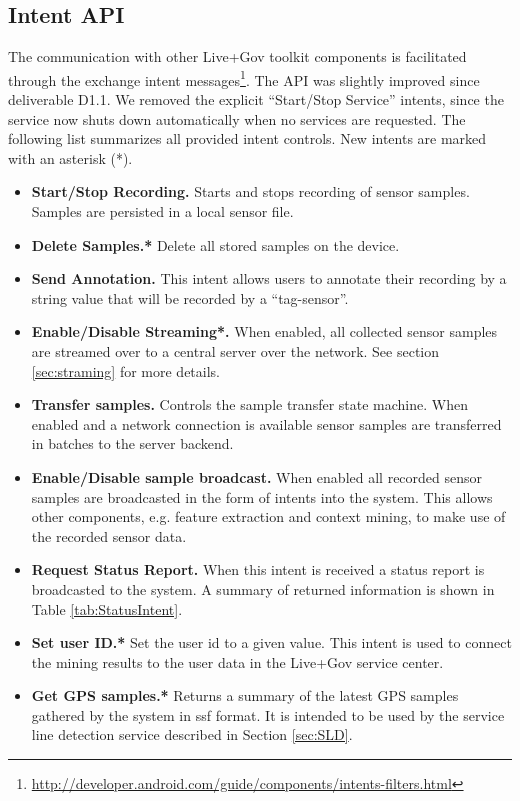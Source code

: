 \subsection{Intent API}
\label{subsubsec:IntentAPIdescription}

The communication with other Live+Gov toolkit components is
facilitated through the exchange intent
messages\footnote{\url{http://developer.android.com/guide/components/intents-filters.html}}.
The API was slightly improved since deliverable D1.1. We removed the
explicit ``Start/Stop Service'' intents, since the service now shuts
down automatically when no services are requested. The following list
summarizes all provided intent controls. New intents are marked with
an asterisk (*).

\begin{itemize}
\item {\bfseries Start/Stop Recording.} Starts and stops recording of
  sensor samples. Samples are persisted in a local sensor file.
\item {\bfseries Delete Samples.*} Delete all stored samples on the
  device.
\item {\bf Send Annotation.} This intent allows users to annotate
  their recording by a string value that will be recorded by a
  ``tag-sensor''.
\item {\bfseries Enable/Disable Streaming*.} When enabled, all
  collected sensor samples are streamed over to a central server over
  the network. See section \ref{sec:straming} for more details.
\item {\bfseries Transfer samples.}  Controls the sample transfer
  state machine. When enabled and a network connection is available
  sensor samples are transferred in batches to the server backend.
\item {\bfseries Enable/Disable sample broadcast.} When enabled all
  recorded sensor samples are broadcasted in the form of intents into
  the system. This allows other components, e.g. feature extraction
  and context mining, to make use of the recorded sensor data.
\item {\bfseries Request Status Report.} When this intent is received
  a status report is broadcasted to the system. A summary of returned
  information is shown in Table \ref{tab:StatusIntent}.
\item {\bfseries Set user ID.*} Set the user id to a given value. This
  intent is used to connect the mining results to the user data in the
  Live+Gov service center.
\item {\bfseries Get GPS samples.*} Returns a summary of the latest
  GPS samples gathered by the system in ssf format. It is intended to
  be used by the service line detection service described in Section \ref{sec:SLD}.
\end{itemize}

